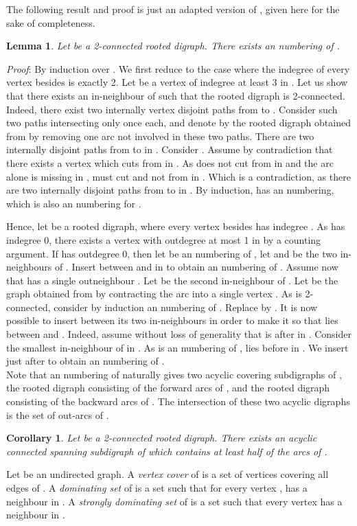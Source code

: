 \documentclass{article}
\newtheorem{lemma}{Lemma}
\newtheorem{coro}{Corollary}
\begin{document}
The following result and proof is just an adapted version of \cite{stnumdir},  given here for the sake of completeness.
 
\begin{lemma}\label{rrnum}
Let  be a 2-connected rooted digraph. There exists an  numbering of .
\end{lemma}
\emph{Proof}: By induction over . We first reduce to the case where the indegree of every vertex besides  is exactly 2. Let  be a vertex of indegree at least 3 in . Let us show that there exists an in-neighbour  of  such that the rooted digraph  is 2-connected.
Indeed, there exist two internally vertex disjoint paths from  to . Consider such two paths intersecting  only once each, and denote by  the rooted digraph obtained from  by removing one arc  not involved in these two paths. There are two internally disjoint paths from  to  in . Consider . Assume by contradiction that there exists a vertex  which cuts  from  in . As  does not cut  from  in  and the arc  alone is missing in ,  must cut  and not  from  in . Which is a contradiction, as there are two internally disjoint paths from  to  in . By induction,  has an  numbering, which is also an  numbering for .

Hence, let  be a rooted digraph, where every vertex besides  has indegree . As  has indegree 0, there exists a vertex  with outdegree at most 1 in  by a counting argument. If  has outdegree 0, then let  be an  numbering of , let  and  be the two in-neighbours of . Insert  between  and  in  to obtain an  numbering of .
Assume now that  has a single outneighbour . Let  be the second in-neighbour of . Let  be the graph obtained from  by contracting the arc  into a single vertex . As  is 2-connected, consider by induction an  numbering  of . Replace  by . It is now possible to insert  between its two in-neighbours in order to make it so that  lies between  and . Indeed, assume without loss of generality that  is after  in . Consider the smallest in-neighbour  of  in . As  is an  numbering of ,  lies before  in . We insert  just after  to obtain an  numbering of . 
\\


Note that an  numbering  of  naturally gives two acyclic covering subdigraphs of , the rooted digraph  consisting of the forward arcs of , and the rooted digraph  consisting of the backward arcs of . The intersection of these two acyclic digraphs is the set of out-arcs of .

\begin{coro}
Let  be a 2-connected rooted digraph. There exists an acyclic connected spanning subdigraph  of  which contains at least half of the arcs of .
\end{coro}
Let  be an undirected graph. A \emph{vertex cover} of  is a set of vertices covering all edges of . A \emph{dominating set} of  is a set  such that for every vertex ,  has a neighbour in . A \emph{strongly dominating set} of  is a set  such that every vertex has a neighbour in .
\end{document}
